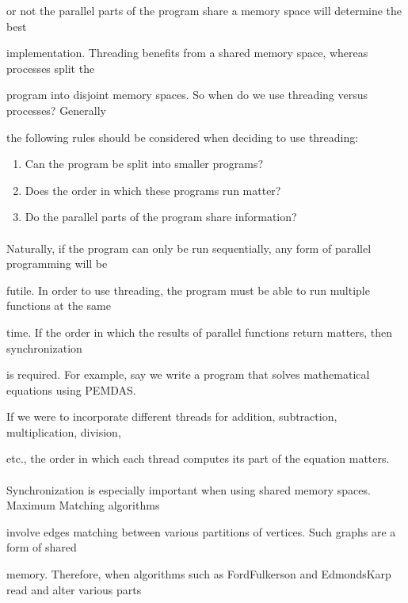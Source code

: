 or not the parallel parts of the program share a memory space will determine the best 

implementation. Threading benefits from a shared memory space, whereas processes split the 

program into disjoint memory spaces. So when do we use threading versus processes? Generally 

the following rules should be considered when deciding to use threading:


\begin{enumerate}

    \item Can the program be split into smaller programs?
    
    \item Does the order in which these programs run matter?
    
    \item Do the parallel parts of the program share information?

\end{enumerate}


\paragraph{}
Naturally, if the program can only be run sequentially, any form of parallel programming will be 

futile. In order to use threading, the program must be able to run multiple functions at the same 

time. If the order in which the results of parallel functions return matters, then synchronization

is required. For example, say we write a program that solves mathematical equations using PEMDAS. 

If we were to incorporate different threads for addition, subtraction, multiplication, division, 

etc., the order in which each thread computes its part of the equation matters. 


\paragraph{}
Synchronization is especially important when using shared memory spaces. Maximum Matching algorithms 

involve edges matching between various partitions of vertices. Such graphs are a form of shared 

memory. Therefore, when algorithms such as FordFulkerson and EdmondsKarp read and alter various parts 

